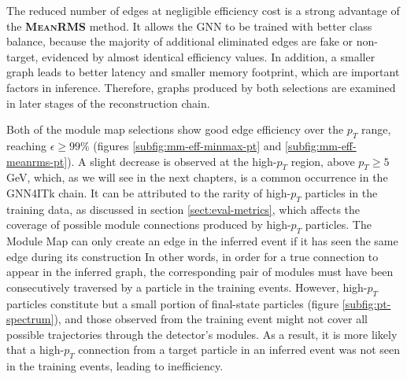 The reduced number of edges at negligible efficiency cost is a strong advantage of the \textbf{\textsc{MeanRMS}} method. 
It allows the GNN to be trained with better class balance, because the majority of additional eliminated edges are fake or non-target, evidenced by almost identical efficiency values. 
In addition, a smaller graph leads to better latency and smaller memory footprint, which are important factors in inference. 
Therefore, graphs produced by both selections are examined in later stages of the reconstruction chain.

Both of the module map selections show good edge efficiency over the $p_T$ range, reaching $\epsilon \ge 99\%$ (figures \ref{subfig:mm-eff-minmax-pt} and \ref{subfig:mm-eff-meanrms-pt}).
A slight decrease is observed at the high-$p_T$ region, above $p_T \ge 5$ GeV, which, as we will see in the next chapters, is a common occurrence in the GNN4ITk chain.
It can be attributed to the rarity of high-$p_T$ particles in the training data, as discussed in section \ref{sect:eval-metrics}, which affects the coverage of possible module connections produced by high-$p_T$ particles.
The Module Map can only create an edge in the inferred event if it has seen the same edge during its construction
In other words, in order for a true connection to appear in the inferred graph, the corresponding pair of modules must have been consecutively traversed by a particle in the training events.
However, high-$p_T$ particles constitute but a small portion of final-state particles (figure \ref{subfig:pt-spectrum}), and those observed from the training event might not cover all possible trajectories through the detector's modules.
As a result, it is more likely that a high-$p_T$ connection from a target particle in an inferred event was not seen in the training events, leading to inefficiency.

